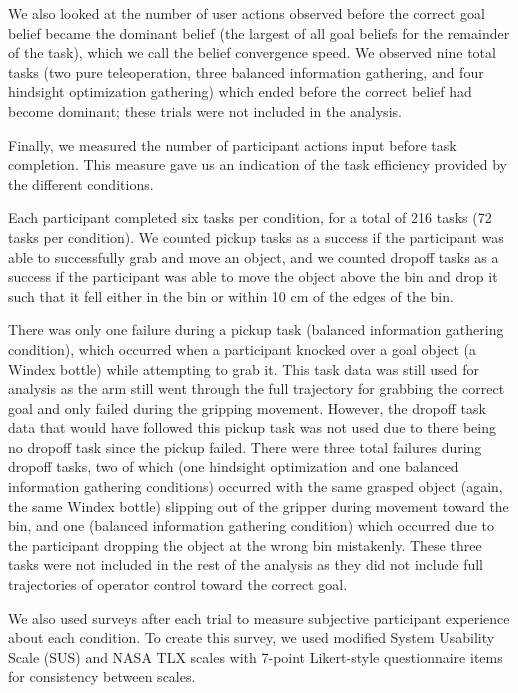 \documentclass[conference]{IEEEtran}
\begin{document}
We also looked at the number of user actions observed before the correct goal belief became the dominant belief (the largest of all goal beliefs for the remainder of the task), which we call the belief convergence speed. We observed nine total tasks (two pure teleoperation, three balanced information gathering, and four hindsight optimization gathering) which ended before the correct belief had become dominant; these trials were not included in the analysis.

Finally, we measured the number of participant actions input before task completion. This measure gave us an indication of the task efficiency provided by the different conditions.

Each participant completed six tasks per condition, for a total of 216 tasks (72 tasks per condition). We counted pickup tasks as a success if the participant was able to successfully grab and move an object, and we counted dropoff tasks as a success if the participant was able to move the object above the bin and drop it such that it fell either in the bin or within 10 cm of the edges of the bin. 

There was only one failure during a pickup task (balanced information gathering condition), which occurred when a participant knocked over a goal object (a Windex bottle) while attempting to grab it. This task data was still used for analysis as the arm still went through the full trajectory for grabbing the correct goal and only failed during the gripping movement. However, the dropoff task data that would have followed this pickup task was not used due to there being no dropoff task since the pickup failed. There were three total failures during dropoff tasks, two of which (one hindsight optimization and one balanced information gathering conditions) occurred with the same grasped object (again, the same Windex bottle) slipping out of the gripper during movement toward the bin, and one (balanced information gathering condition) which occurred due to the participant dropping the object at the wrong bin mistakenly. These three tasks were not included in the rest of the analysis as they did not include full trajectories of operator control toward the correct goal.

We also used surveys after each trial to measure subjective participant experience about each condition. To create this survey, we used modified System Usability Scale (SUS) and NASA TLX scales with 7-point Likert-style questionnaire items for consistency between scales.
\end{document}
